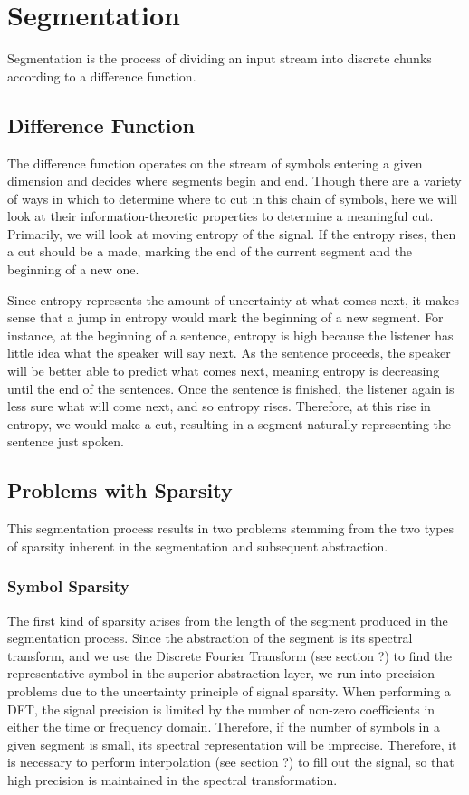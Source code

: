 \chapter{Segmentation}

Segmentation is the process of dividing an input stream into discrete chunks according to a difference function.

\section{Difference Function}
The difference function operates on the stream of symbols entering a given dimension and decides where segments begin and end.  Though there are a variety of ways in which to determine where to cut in this chain of symbols, here we will look at their information-theoretic properties to determine a meaningful cut. Primarily, we will look at moving entropy of the signal.  If the entropy rises, then a cut should be a made, marking the end of the current segment and the beginning of a new one.

Since entropy represents the amount of uncertainty at what comes next, it makes sense that a jump in entropy would mark the beginning of a new segment.  For instance, at the beginning of a sentence, entropy is high because the listener has little idea what the speaker will say next. As the sentence proceeds, the speaker will be better able to predict what comes next, meaning entropy is decreasing until the end of the sentences.  Once the sentence is finished, the listener again is less sure what will come next, and so entropy rises.  Therefore, at this rise in entropy, we would make a cut, resulting in a segment naturally representing the sentence just spoken.

\section{Problems with Sparsity}
This segmentation process results in two problems stemming from the two types of sparsity inherent in the segmentation and subsequent abstraction.

\subsection{Symbol Sparsity}
The first kind of sparsity arises from the length of the segment produced in the segmentation process.  Since the abstraction of the segment is its spectral transform, and we use the Discrete Fourier Transform (see section ?) to find the representative symbol in the superior abstraction layer, we run into precision problems due to the uncertainty principle of signal sparsity.  When performing a DFT, the signal precision is limited by the number of non-zero coefficients in either the time or frequency domain.  Therefore, if the number of symbols in a given segment is small, its spectral representation will be imprecise.  Therefore, it is necessary to perform interpolation (see section ?) to fill out the signal, so that high precision is maintained in the spectral transformation.

